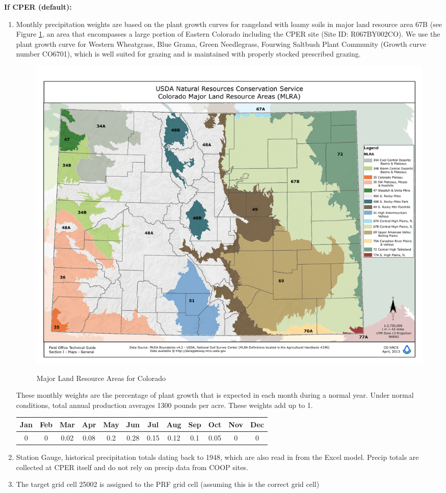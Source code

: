 \documentclass[11pt]{article}
\begin{document}
\textbf{If CPER (default):}
\begin{enumerate}
\item Monthly precipitation weights are based on the plant growth curves for rangeland with loamy soils in major land resource area 67B (see Figure \ref{MLRA}, an area that encompasses a large portion of Eastern Colorado including the CPER site (Site ID: R067BY002CO). We use the plant growth curve for Western Wheatgrass, Blue Grama, Green Needlegrass, Fourwing Saltbush Plant Community (Growth curve number CO6701), which is well suited for grazing and is maintained with properly stocked prescribed grazing. 

\begin{figure}
\begin{center}
\label{MLRA}
\includegraphics[scale=.5]{CO_MLRAs}
\end{center}
\caption{Major Land Resource Areas for Colorado}
\end{figure}

These monthly weights are the percentage of plant growth that is expected in each month during a normal year. Under normal conditions, total annual production averages 1300 pounds per acre. These weights add up to 1. 

\begin{tabular}{|cccccccccccc|}
\hline
Jan & Feb & Mar & Apr &May & Jun & Jul & Aug &Sep & Oct& Nov& Dec \\
\hline
0  & 0 &0.02& 0.08 &0.2 &0.28 &0.15 &0.12 &0.1 &0.05 &  0 &  0 \\
\hline
\end{tabular}

\item Station Gauge, historical precipitation totals dating back to 1948, which are also read in from the Excel model. Precip totals are collected at CPER itself and do not rely on precip data from COOP sites.
\item The target grid cell 25002 is assigned to the PRF grid cell (assuming this is the correct grid cell)
\end{enumerate}
\end{document}

